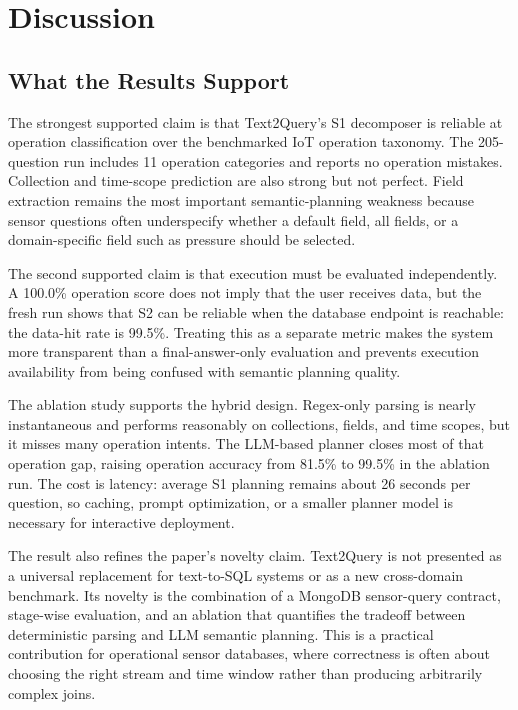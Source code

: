 \documentclass[11pt]{article}
\begin{document}
\FloatBarrier

\section{Discussion}

\subsection{What the Results Support}

The strongest supported claim is that Text2Query's S1 decomposer is reliable at operation classification over the benchmarked IoT operation taxonomy. The 205-question run includes 11 operation categories and reports no operation mistakes. Collection and time-scope prediction are also strong but not perfect. Field extraction remains the most important semantic-planning weakness because sensor questions often underspecify whether a default field, all fields, or a domain-specific field such as pressure should be selected.

The second supported claim is that execution must be evaluated independently. A 100.0\% operation score does not imply that the user receives data, but the fresh run shows that S2 can be reliable when the database endpoint is reachable: the data-hit rate is 99.5\%. Treating this as a separate metric makes the system more transparent than a final-answer-only evaluation and prevents execution availability from being confused with semantic planning quality.

The ablation study supports the hybrid design. Regex-only parsing is nearly instantaneous and performs reasonably on collections, fields, and time scopes, but it misses many operation intents. The LLM-based planner closes most of that operation gap, raising operation accuracy from 81.5\% to 99.5\% in the ablation run. The cost is latency: average S1 planning remains about 26 seconds per question, so caching, prompt optimization, or a smaller planner model is necessary for interactive deployment.

The result also refines the paper's novelty claim. Text2Query is not presented as a universal replacement for text-to-SQL systems or as a new cross-domain benchmark. Its novelty is the combination of a MongoDB sensor-query contract, stage-wise evaluation, and an ablation that quantifies the tradeoff between deterministic parsing and LLM semantic planning. This is a practical contribution for operational sensor databases, where correctness is often about choosing the right stream and time window rather than producing arbitrarily complex joins.
\end{document}
